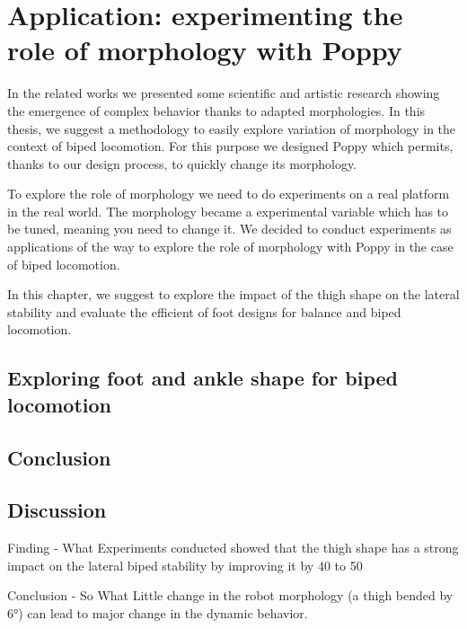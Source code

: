 
\chapter{Application: experimenting the role of morphology with Poppy} %
\label{cha:exploring_the_role_of_morphology}


In the related works we presented some scientific and artistic research showing the emergence of complex behavior thanks to adapted morphologies. In this thesis, we suggest a methodology to easily explore variation of morphology in the context of biped locomotion.
For this purpose we designed Poppy which permits, thanks to our design process, to quickly change its morphology.

To explore the role of morphology we need to do experiments on a real platform in the real world. The morphology became a experimental variable which has to be tuned, meaning you need to change it.
We decided to conduct experiments as applications of the way to explore the role of morphology with Poppy in the case of biped locomotion.

In this chapter,  we suggest to explore the impact of the thigh shape on the lateral stability and evaluate the efficient of foot designs for balance and biped locomotion.



\section{Exploring foot and ankle shape for biped locomotion} %
\label{sec:exploring_foot_and_ankle_shape_for_biped_locomotion}


\section{Conclusion} %
\label{sec:conclusion}


\section{Discussion} %
\label{sec:discussion}


Finding - What
Experiments conducted showed that the thigh shape has a strong impact on the lateral biped stability by improving it by 40 to 50%

Conclusion - So What
Little change in the robot morphology (a thigh bended by 6°) can lead to major change in the dynamic behavior.


